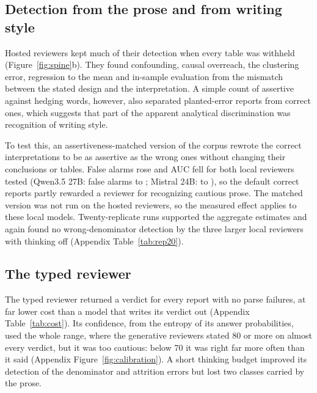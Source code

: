 \subsection{Detection from the prose and from writing style}
\label{sec:results-prose}

Hosted reviewers kept much of their detection when every table was withheld (Figure~\ref{fig:spine}b). They found confounding, causal overreach, the clustering error, regression to the mean and in-sample evaluation from the mismatch between the stated design and the interpretation. A simple count of assertive against hedging words, however, also separated planted-error reports from correct ones, which suggests that part of the apparent analytical discrimination was recognition of writing style.

To test this, an assertiveness-matched version of the corpus rewrote the correct interpretations to be as assertive as the wrong ones without changing their conclusions or tables. False alarms rose and AUC fell for both local reviewers tested (Qwen3.5 27B: false alarms  to ; Mistral 24B:  to ), so the default correct reports partly rewarded a reviewer for recognizing cautious prose. The matched version was not run on the hosted reviewers, so the measured effect applies to these local models. Twenty-replicate runs supported the aggregate estimates and again found no wrong-denominator detection by the three larger local reviewers with thinking off (Appendix Table~\ref{tab:rep20}).

\subsection{The typed reviewer}
\label{sec:results-typed}

The typed reviewer returned a verdict for every report with no parse failures, at far lower cost than a model that writes its verdict out (Appendix Table~\ref{tab:cost}). Its confidence, from the entropy of its answer probabilities, used the whole range, where the generative reviewers stated 80 or more on almost every verdict, but it was too cautious: below 70 it was right far more often than it said (Appendix Figure~\ref{fig:calibration}). A short thinking budget improved its detection of the denominator and attrition errors but lost two classes carried by the prose.
